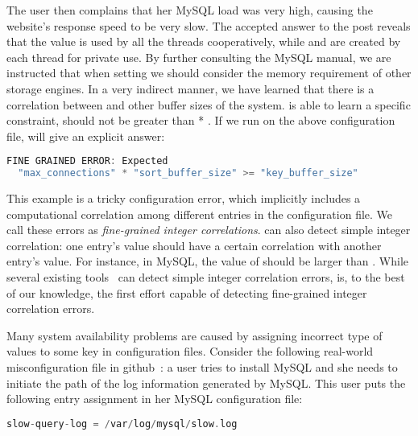 The user then complains that her MySQL load was very high, 
causing the website's response speed to be very slow.
The accepted answer to the post reveals that the value  
is used by all the threads cooperatively, 
while  and  are created 
by each thread for private use.
By further consulting the MySQL manual, 
we are instructed that when setting  we should consider the memory requirement of other storage engines.
In a very indirect manner, we have learned that there is a correlation
between  and other buffer sizes of the system.
\app is able to learn a specific constraint, \ie
{} should not be greater than
 * .
If we run \app on the above configuration file, \app will give an explicit answer:

\begin{lstlisting}[language=C, xleftmargin=.01\textwidth]
FINE GRAINED ERROR: Expected 
  "max_connections" * "sort_buffer_size" >= "key_buffer_size"
\end{lstlisting} 

This example is a tricky configuration error, which implicitly
includes a computational correlation among different entries
in the configuration file.
We call these errors as {\em fine-grained integer correlations}. 
\app can also detect simple integer correlation: one entry's
value should have a certain correlation with another entry's 
value.
For instance, in MySQL, the value of  
should be larger than .
While several existing tools~\cite{yin11anempirical, zhang14encore}
can detect simple integer correlation errors,
\app is, to the best of our knowledge, the first effort capable of
detecting fine-grained integer correlation errors.

Many system availability problems are caused by 
assigning incorrect type of values to some key in configuration
files. Consider the following real-world misconfiguration
file in github~\cite{typeerror}:
a user tries to install MySQL and she needs to initiate the path
of the log information generated by MySQL.
This user puts the following entry assignment in her MySQL
configuration file: 

\begin{lstlisting}[language=C, xleftmargin=.01\textwidth]
    slow-query-log = /var/log/mysql/slow.log
\end{lstlisting} 

